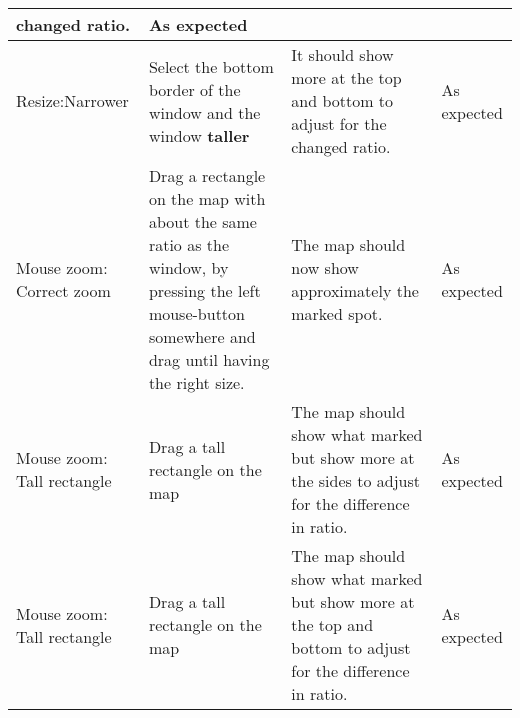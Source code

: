 \begin{centering}
\begin{longtable}{|p{}|p{}|p{}|p{}|}
changed ratio. & As expected\\
\hline
Resize:Narrower & Select the bottom border of the window and the window
\textbf{taller} & It should show more at the top and bottom to adjust for the
changed ratio. & As expected\\
\hline
\hline
Mouse zoom: Correct zoom & Drag a rectangle on the map with about the same ratio
as the window, by pressing the left mouse-button somewhere and drag until having
the right size. & The map should now show approximately the marked spot. & As
expected\\
\hline
Mouse zoom: Tall rectangle & Drag a tall rectangle on the map & The map should
show what marked but show more at the sides to adjust for the difference in
ratio. & As expected\\
\hline
Mouse zoom: Tall rectangle & Drag a tall rectangle on the map & The map should
show what marked but show more at the top and bottom to adjust for the
difference in ratio. & As expected\\
\hline
\end{longtable}
\end{centering}